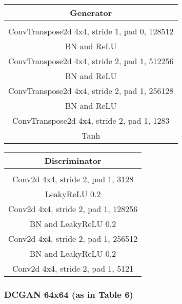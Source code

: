 \documentclass{article}
\begin{document}
\begin{center}
\begin{tabular}{c}
	Generator \\
	\toprule\midrule
	 \\
	\midrule
	ConvTranspose2d 4x4, stride 1, pad 0, 128512 \\
	\midrule
	BN and ReLU \\
	\midrule
	ConvTranspose2d 4x4, stride 2, pad 1, 512256 \\
	\midrule
	BN and ReLU \\
	\midrule
	ConvTranspose2d 4x4, stride 2, pad 1, 256128 \\
	\midrule
	BN and ReLU \\
	\midrule
	ConvTranspose2d 4x4, stride 2, pad 1, 1283 \\
	\midrule
	Tanh \\
	\bottomrule
\end{tabular} 
\end{center}
\begin{center}
\begin{tabular}{c}
	Discriminator \\
	\toprule\midrule
	 \\
	\midrule
	Conv2d 4x4, stride 2, pad 1, 3128 \\
	\midrule
	LeakyReLU 0.2 \\
	\midrule
	Conv2d 4x4, stride 2, pad 1, 128256 \\
	\midrule
	BN and LeakyReLU 0.2 \\
	\midrule
	Conv2d 4x4, stride 2, pad 1, 256512 \\
	\midrule
	BN and LeakyReLU 0.2 \\
	\midrule
	Conv2d 4x4, stride 2, pad 1, 5121 \\
	\bottomrule
\end{tabular}
\end{center}

\subsubsection{DCGAN 64x64 (as in Table 6)}
\end{document}
